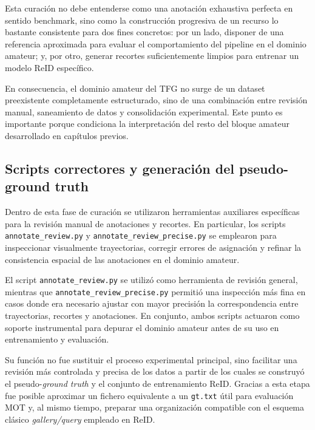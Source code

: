 \documentclass[../MAIN.tex]{subfiles}
\begin{document}
	Esta curación no debe entenderse como una anotación exhaustiva perfecta en sentido benchmark, sino como la construcción progresiva de un recurso lo bastante consistente para dos fines concretos: por un lado, disponer de una referencia aproximada para evaluar el comportamiento del pipeline en el dominio amateur; y, por otro, generar recortes suficientemente limpios para entrenar un modelo ReID específico.
	
	En consecuencia, el dominio amateur del TFG no surge de un dataset preexistente completamente estructurado, sino de una combinación entre revisión manual, saneamiento de datos y consolidación experimental. Este punto es importante porque condiciona la interpretación del resto del bloque amateur desarrollado en capítulos previos.
	
	\subsection{Scripts correctores y generación del pseudo-ground truth}
	
	Dentro de esta fase de curación se utilizaron herramientas auxiliares específicas para la revisión manual de anotaciones y recortes. En particular, los scripts \texttt{annotate\_review.py} y \texttt{annotate\_review\_precise.py} se emplearon para inspeccionar visualmente trayectorias, corregir errores de asignación y refinar la consistencia espacial de las anotaciones en el dominio amateur.
	
	El script \texttt{annotate\_review.py} se utilizó como herramienta de revisión general, mientras que \texttt{annotate\_review\_precise.py} permitió una inspección más fina en casos donde era necesario ajustar con mayor precisión la correspondencia entre trayectorias, recortes y anotaciones. En conjunto, ambos scripts actuaron como soporte instrumental para depurar el dominio amateur antes de su uso en entrenamiento y evaluación.
	
	Su función no fue sustituir el proceso experimental principal, sino facilitar una revisión más controlada y precisa de los datos a partir de los cuales se construyó el pseudo-\textit{ground truth} y el conjunto de entrenamiento ReID. Gracias a esta etapa fue posible aproximar un fichero equivalente a un \texttt{gt.txt} útil para evaluación MOT y, al mismo tiempo, preparar una organización compatible con el esquema clásico \textit{gallery/query} empleado en ReID.
	
\end{document}
